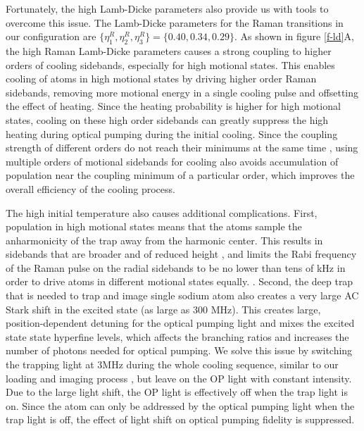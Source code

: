 \documentclass[aps,prl,twocolumn,groupedaddress]{revtex4-1}
\begin{document}
Fortunately, the high Lamb-Dicke parameters also
provide us with tools to overcome this issue. The Lamb-Dicke parameters for the
Raman transitions in our configuration are $\{\eta^R_{1},\eta^R_{2},\eta^R_{3}\} = \{0.40, 0.34, 0.29\}$. As shown in
figure \ref{f-ld}A, the high Raman Lamb-Dicke parameters causes a strong coupling to higher orders
of cooling sidebands, especially for high motional states.
This enables cooling of atoms in high motional states by driving higher order Raman sidebands,
removing more motional energy in a single cooling pulse and offsetting the effect of heating. Since the heating probability is higher for high motional states,
cooling on these high order sidebands can greatly suppress the high heating during
optical pumping during the initial cooling. Since the coupling strength of different orders
do not reach their minimums at the same time , using multiple orders of motional sidebands
for cooling also avoids accumulation of population near the coupling minimum of a particular
order, which improves the overall efficiency of the cooling process.

The high initial temperature also causes additional complications.  First, population in high motional states means that the atoms sample
the anharmonicity of the trap away from the harmonic center. This results in sidebands that are broader and of reduced height , and limits the Rabi frequency of the Raman pulse
on the radial sidebands to be no lower than tens of kHz in order to drive atoms in
different motional states equally. .
Second, the deep trap that is needed to trap and image single sodium atom also creates
a very large AC Stark shift in the excited state (as large as 300 MHz).
This creates large, position-dependent detuning for the optical pumping light and mixes the excited state state hyperfine levels,
which affects the branching ratios and increases the number of photons needed for optical pumping.
We solve this issue by switching the trapping light at $3\text{MHz}$
during the whole cooling sequence, similar to our loading and imaging process \cite{Hutzler2017-LightShifts}, but leave on the OP light with constant intensity.
Due to the large light shift, the OP light is effectively off when the trap light is on.
Since the atom can only be addressed by the optical pumping light when the trap light is off,
the effect of light shift on optical pumping fidelity is suppressed.
\end{document}
